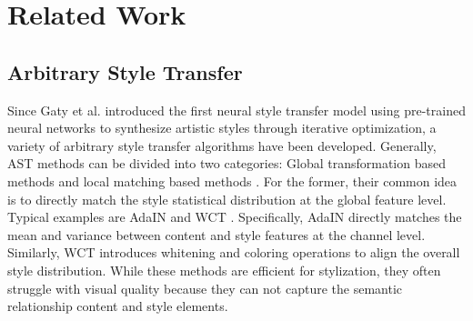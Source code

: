 \section{Related Work}
\label{sec:relatedWork}
\subsection{Arbitrary Style Transfer}
Since Gaty et al. \cite{gatys} introduced the first neural style transfer model using pre-trained neural networks to synthesize artistic styles through iterative optimization, a variety of arbitrary style transfer algorithms \cite{artflow,cl1,IEC,styleformer,Avatar-net,deep_reshufffle} have been developed. Generally, AST methods can be divided into two categories: Global transformation based methods \cite{adain,wct,gt_ast1,gt_ast2,efdm} and local matching based methods \cite{Avatar-net,chenqianqi,sanet,aespa-net,stytr2}. 
For the former, their common idea is to directly match the style statistical distribution at the global feature level. 
Typical examples are AdaIN \cite{adain} and WCT \cite{wct}. 
Specifically, AdaIN directly matches the mean and variance between content and style features at the channel level. Similarly, WCT introduces whitening and coloring operations to align the overall style distribution. While these methods are efficient for stylization, they often struggle with visual quality because they can not capture the semantic relationship  content and style elements. 

